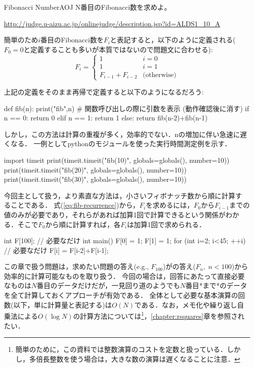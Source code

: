 \begin{psbox}{Fibonacci Number}{AOJ}
N番目のFibonacci数を求めよ。  

\url{http://judge.u-aizu.ac.jp/onlinejudge/description.jsp?id=ALDS1_10_A}
\end{psbox}

簡単のため$i$番目のFibonacci数を$F_i$と表記すると，以下のように定義される($F_0=0$と定義することも多いが本質ではないので問題文に合わせる):
\begin{equation}
  F_i = \left\{
  \begin{array}{ll}
    1 & i=0\\
    1 & i=1\\
    F_{i-1}+F_{i-2} & \mbox{(otherwise)}
  \end{array}\right.\label{eq:fib-recurrence}
\end{equation}

上記の定義をそのまま再帰で定義すると以下のようになるだろう:
\begin{pybox}
def fib(n):
    print("fib",n) # 関数呼び出しの際に引数を表示 (動作確認後に消す)
    if n == 0:
        return 0
    elif n == 1:
        return 1
    else:
        return fib(n-2)+fib(n-1)
\end{pybox}

しかし，この方法は計算の重複が多く，効率的でない．nの増加に伴い急速に遅くなる．
一例としてpythonのモジュールを使った実行時間測定例を示す．
\begin{pybox}[emph=timeit]
import timeit
print(timeit.timeit("fib(10)", globals=globals(), number=10))
print(timeit.timeit("fib(20)", globals=globals(), number=10))
print(timeit.timeit("fib(30)", globals=globals(), number=10))
\end{pybox}


今回主として扱う，より素直な方法は，小さいフィボナッチ数から順に計算す
ることである．
式(\ref{eq:fib-recurrence})から，$F_i$を求めるには，$F_0$から$F_{i-1}$までの値のみが必要であり，それらがあれば加算1回で計算できるという関係がわかる．そこで$F_0$から順に計算すれば，各$F_i$は加算1回で求められる．
\begin{cbox}
int F[100]; // 必要なだけ
int main() {
  F[0] = 1;
  F[1] = 1;
  for (int i=2; i<45; ++i) { // 必要なだけ
    F[i] = F[i-2]+F[i-1];
  }
}
\end{cbox}
この章で扱う問題は，求めたい問題の答え(e.g., $F_{100}$)がの答え($F_{n}, \; n<100$)から効率的に計算可能なものを取り扱う．
今回の場合は，回答にあたって直接必要なものは$N$番目のデータだけだが，一見回り道のようでも$N$番目*まで*のデータを全て計算しておくアプローチが有効である．
全体として必要な基本演算の回数(以下，単に計算量と表記する)は$O(N)$である．なお，メモ化や繰り返し自乗法による$O(\log N)$の計算方法については\footnote{簡単のために，この資料では整数演算のコストを定数と扱っている．しかし，多倍長整数を使う場合は，大きな数の演算は遅くなることに注意．}，\ref{chapter:rsquares}章を参照されたい．


